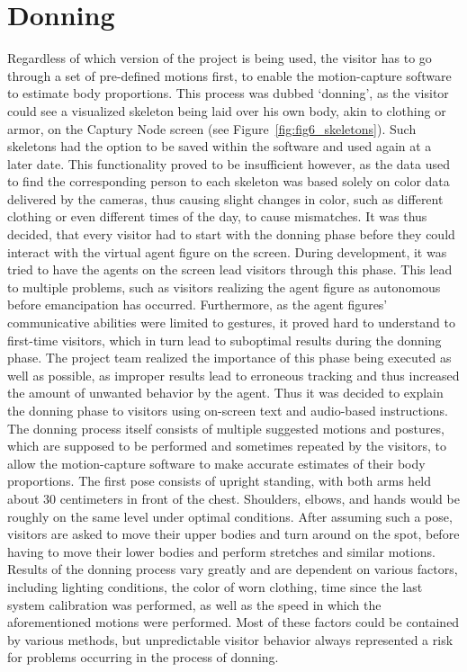 \documentclass[draft,final]{vutinfth} %
\begin{document}
\section{Donning}
\label{chap:donning}

Regardless of which version of the project is being used, the visitor has to go through a set of pre-defined motions first, to enable the motion-capture software to estimate body proportions. 
This process was dubbed ‘donning’, as the visitor could see a visualized skeleton being laid over his own body, akin to clothing or armor, on the Captury Node screen (see Figure~\ref{fig:fig6_skeletons}). 
Such skeletons had the option to be saved within the software and used again at a later date. 
This functionality proved to be insufficient however, as the data used to find the corresponding person to each skeleton was based solely on color data delivered by the cameras, thus causing slight changes in color, such as different clothing or even different times of the day, to cause mismatches. 
It was thus decided, that every visitor had to start with the donning phase before they could interact with the virtual agent figure on the screen. 
During development, it was tried to have the agents on the screen lead visitors through this phase. 
This lead to multiple problems, such as visitors realizing the agent figure as autonomous before emancipation has occurred. 
Furthermore, as the agent figures’ communicative abilities were limited to gestures, it proved hard to understand to first-time visitors, which in turn lead to suboptimal results during the donning phase. 
The project team realized the importance of this phase being executed as well as possible, as improper results lead to erroneous tracking and thus increased the amount of unwanted behavior by the agent. 
Thus it was decided to explain the donning phase to visitors using on-screen text and audio-based instructions. \\
The donning process itself consists of multiple suggested motions and postures, which are supposed to be performed and sometimes repeated by the visitors, to allow the motion-capture software to make accurate estimates of their body proportions. 
The first pose consists of upright standing, with both arms held about 30 centimeters in front of the chest. 
Shoulders, elbows, and hands would be roughly on the same level under optimal conditions. 
After assuming such a pose, visitors are asked to move their upper bodies and turn around on the spot, before having to move their lower bodies and perform stretches and similar motions. 
Results of the donning process vary greatly and are dependent on various factors, including lighting conditions, the color of worn clothing, time since the last system calibration was performed, as well as the speed in which the aforementioned motions were performed. 
Most of these factors could be contained by various methods, but unpredictable visitor behavior always represented a risk for problems occurring in the process of donning.
\end{document}
